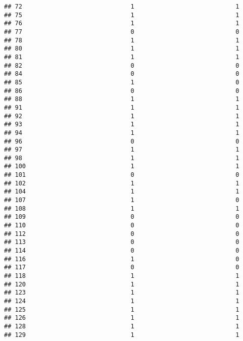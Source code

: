 \documentclass[
]{article}
\begin{document}
\begin{verbatim}
## 72                              1                            1
## 75                              1                            1
## 76                              1                            1
## 77                              0                            0
## 78                              1                            1
## 80                              1                            1
## 81                              1                            1
## 82                              0                            0
## 84                              0                            0
## 85                              1                            0
## 86                              0                            0
## 88                              1                            1
## 91                              1                            1
## 92                              1                            1
## 93                              1                            1
## 94                              1                            1
## 96                              0                            0
## 97                              1                            1
## 98                              1                            1
## 100                             1                            1
## 101                             0                            0
## 102                             1                            1
## 104                             1                            1
## 107                             1                            0
## 108                             1                            1
## 109                             0                            0
## 110                             0                            0
## 112                             0                            0
## 113                             0                            0
## 114                             0                            0
## 116                             1                            0
## 117                             0                            0
## 118                             1                            1
## 120                             1                            1
## 123                             1                            1
## 124                             1                            1
## 125                             1                            1
## 126                             1                            1
## 128                             1                            1
## 129                             1                            1

\end{verbatim}
\end{document}
